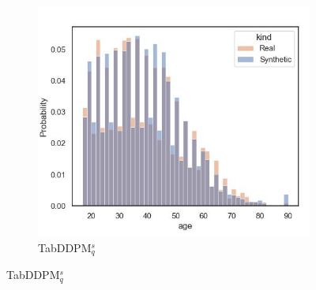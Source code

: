 \begin{figure}[h]
\begin{subfigure}{0.32\textwidth}
		\centering
		\includegraphics[width=\textwidth]{images/dist_age/tab-ddpm-simTune.jpg}
		\caption{TabDDPM$^{s}_q$}
	\end{subfigure}



\end{figure}
